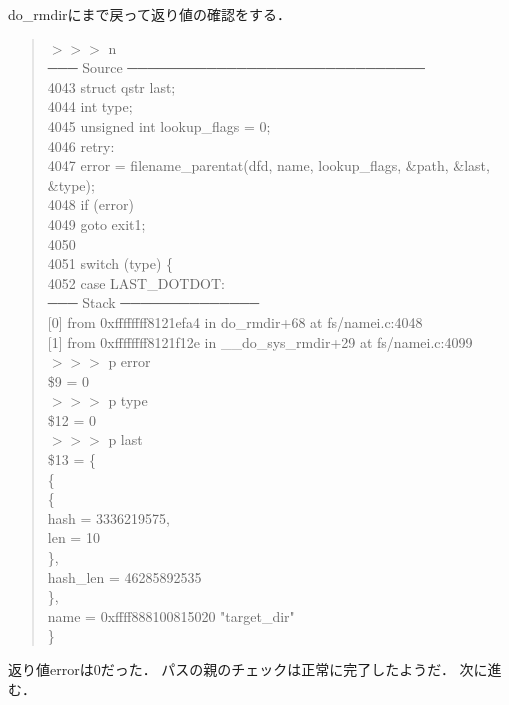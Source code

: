 do\_rmdirにまで戻って返り値の確認をする．
\begin{quote}
$>>>$ n \\
─── Source ──────────────────────────────
\\
 4043      struct qstr last; \\
 4044      int type; \\
 4045      unsigned int lookup\_flags = 0; \\
 4046  retry: \\
 4047      error = filename\_parentat(dfd, name, lookup\_flags, \&path, \&last, \&type); \\
 4048      if (error) \\
 4049          goto exit1; \\
 4050 \\
 4051      switch (type) \{ \\
 4052      case LAST\_DOTDOT: \\
─── Stack ──────────────
\\
{[0]} from 0xffffffff8121efa4 in do\_rmdir+68 at fs/namei.c:4048 \\
{[1]} from 0xffffffff8121f12e in \_\_do\_sys\_rmdir+29 at fs/namei.c:4099 \\
$>>>$ p error \\
\$9 = 0 \\
$>>>$ p type \\
\$12 = 0 \\
$>>>$ p last \\
\$13 = \{ \\
  \{ \\
    \{ \\
      hash = 3336219575, \\
      len = 10 \\
    \}, \\
    hash\_len = 46285892535 \\
  \}, \\
  name = 0xffff888100815020 "target\_dir" \\
\}
\end{quote}

返り値errorは0だった．
パスの親のチェックは正常に完了したようだ．
次に進む．

